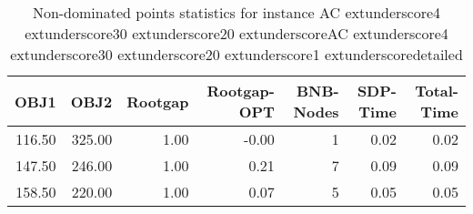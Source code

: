 \begin{table}
\caption{Non-dominated points statistics for instance AC	extunderscore4	extunderscore30	extunderscore20	extunderscoreAC	extunderscore4	extunderscore30	extunderscore20	extunderscore1	extunderscoredetailed}
\label{tab:stats/AC_4_30_20_AC_4_30_20_1_detailed}
\begin{tabular}{rrrrrrr}
\toprule
OBJ1 & OBJ2 & Rootgap & Rootgap-OPT & BNB-Nodes & SDP-Time & Total-Time \\
\midrule
116.50 & 325.00 & 1.00 & -0.00 & 1 & 0.02 & 0.02 \\
147.50 & 246.00 & 1.00 & 0.21 & 7 & 0.09 & 0.09 \\
158.50 & 220.00 & 1.00 & 0.07 & 5 & 0.05 & 0.05 \\
\bottomrule
\end{tabular}
\end{table}
